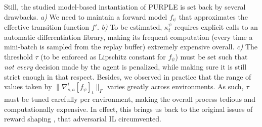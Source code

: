 Still, the studied model-based instantiation of PURPLE is set back by several drawbacks.
\textit{a)} We need to maintain a forward model $f_\psi$ that approximates the effective transition function $f'$.
\textit{b)} To be estimated, $\kappa_t^\psi$ requires explicit calls to an automatic differentiation library,
making its frequent computation (every time a mini-batch is sampled from the replay buffer) extremely expensive overall.
\textit{c)} The threshold $\tau$ (to be enforced as Lipschitz constant for $f_\psi$) must be set such that
\emph{not every} decision made by the agent is penalized, while making sure it is still strict enough in that respect.
Besides, we observed in practice that the range of values taken by $\lVert\nabla_{s,a}^t[f_\psi]_t\rVert _F$
varies greatly across environments.
As such, $\tau$ must be tuned carefully per environment, making the overall process
tedious and computationally expensive.
In effect, this brings us back to the original issues of reward shaping \cite{Ng1999-lv},
that adversarial IL \cite{Ho2016-bv} circumvented.

